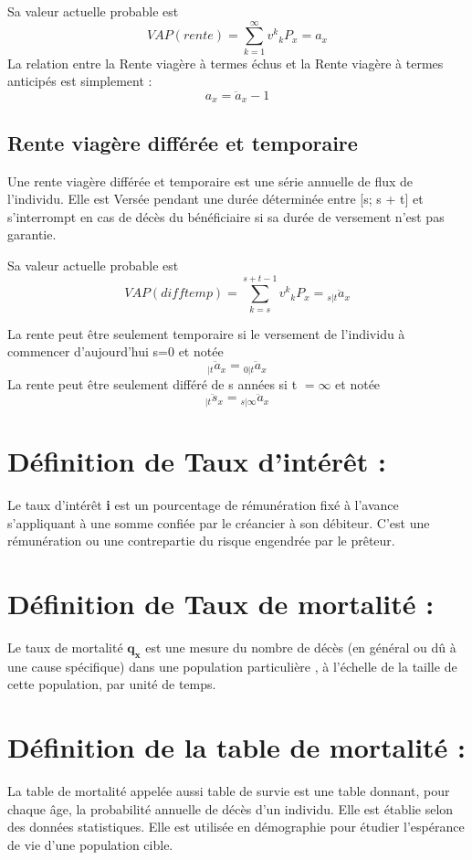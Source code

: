 \documentclass[french]{report}
\begin{document}
\newline Sa valeur actuelle probable est 
 \[ VAP(rente) = \sum_{k=1}^{\infty}v^{k}   {}_k P_{x}= {a}_{x}\]
La relation entre la Rente viagère à termes échus et la Rente viagère à termes anticipés est simplement :
 \[  {a}_{x}= \ddot {a}_{x} - 1\]
\subsection {Rente viagère différée et temporaire}
Une rente viagère différée et temporaire est une série annuelle de flux  de l’individu. Elle est Versée pendant une durée déterminée entre [s; s + t] et s'interrompt en cas de décès du bénéficiaire si sa durée de versement n'est pas garantie.\cite{rente temporaire}


\newline Sa valeur actuelle probable est  \cite{Cours} 
 \[ VAP(difftemp) = \sum_{k=s}^{s+t-1}v^{k}   {}_k P_{x}= {}_{s|t} \ddot {a}_{x}\]
 
La rente peut être seulement temporaire si le versement de
l’individu à commencer d’aujourd’hui {s=0}
et notée \[   {}_{|t} \ddot {a}_{x}={}_{0|t} \ddot {a}_{x} \]
La rente peut être seulement différé de s années si t ${=\infty} $
\newline
et notée 
\[   {}_{|t} \ddot {s}_{x}={}_{s|\infty} \ddot {a}_{x} \]


\section {Définition de Taux d'intérêt :}
Le taux d'intérêt \textbf{i} est un pourcentage de rémunération  fixé à l'avance s'appliquant à une somme confiée par le créancier à son débiteur. C'est une rémunération ou une contrepartie du risque engendrée par le prêteur.

\section {Définition de Taux de mortalité :}
Le taux de mortalité $\mathbf{ q_{x} }$ est une mesure du nombre de décès (en général ou dû à une cause spécifique) dans une population particulière , à l'échelle de la taille de cette population, par unité de temps.

\section {Définition de la table de mortalité :}
La table de mortalité appelée aussi  table de survie est une table donnant, pour chaque âge, la probabilité annuelle de décès d’un individu. Elle est établie selon des données statistiques. Elle est  utilisée en démographie pour étudier l'espérance de vie d'une population cible.\cite{mortalite}
\\
\end{document}
